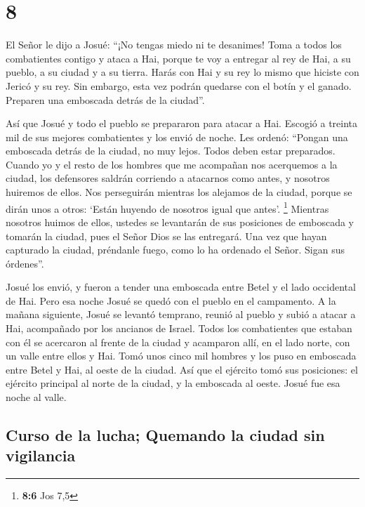 \hypertarget{section-7}{%
\section{8}\label{section-7}}

 El Señor le dijo a Josué: ``¡No tengas miedo ni te
desanimes! Toma a todos los combatientes contigo y ataca a Hai, porque
te voy a entregar al rey de Hai, a su pueblo, a su ciudad y a su tierra.
 Harás con Hai y su rey lo mismo que hiciste con Jericó y
su rey. Sin embargo, esta vez podrán quedarse con el botín y el ganado.
Preparen una emboscada detrás de la ciudad''.

 Así que Josué y todo el pueblo se prepararon para atacar
a Hai. Escogió a treinta mil de sus mejores combatientes y los envió de
noche.  Les ordenó: ``Pongan una emboscada detrás de la
ciudad, no muy lejos. Todos deben estar preparados. 
Cuando yo y el resto de los hombres que me acompañan nos acerquemos a la
ciudad, los defensores saldrán corriendo a atacarnos como antes, y
nosotros huiremos de ellos.  Nos perseguirán mientras los
alejamos de la ciudad, porque se dirán unos a otros: `Están huyendo de
nosotros igual que antes'. \footnote{\textbf{8:6} Jos 7,5}
 Mientras nosotros huimos de ellos, ustedes se levantarán
de sus posiciones de emboscada y tomarán la ciudad, pues el Señor Dios
se las entregará.  Una vez que hayan capturado la ciudad,
préndanle fuego, como lo ha ordenado el Señor. Sigan sus órdenes''.

 Josué los envió, y fueron a tender una emboscada entre
Betel y el lado occidental de Hai. Pero esa noche Josué se quedó con el
pueblo en el campamento.  A la mañana siguiente, Josué se
levantó temprano, reunió al pueblo y subió a atacar a Hai, acompañado
por los ancianos de Israel.  Todos los combatientes que
estaban con él se acercaron al frente de la ciudad y acamparon allí, en
el lado norte, con un valle entre ellos y Hai.  Tomó unos
cinco mil hombres y los puso en emboscada entre Betel y Hai, al oeste de
la ciudad.  Así que el ejército tomó sus posiciones: el
ejército principal al norte de la ciudad, y la emboscada al oeste. Josué
fue esa noche al valle.

\hypertarget{curso-de-la-lucha-quemando-la-ciudad-sin-vigilancia}{%
\subsection{Curso de la lucha; Quemando la ciudad sin
vigilancia}\label{curso-de-la-lucha-quemando-la-ciudad-sin-vigilancia}}

